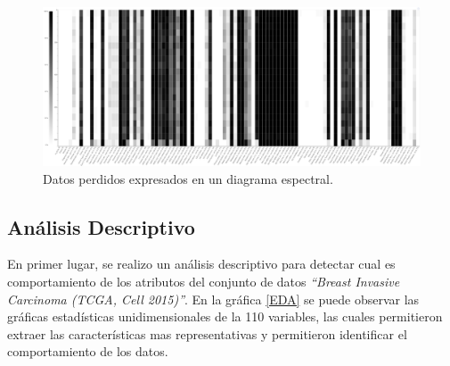 \begin{figure}[!htb]
	\centering
	\includegraphics[width=1
	\linewidth]{IMAGENES/Missing_Spectrum}
	\caption{Datos perdidos expresados en un diagrama espectral.}
	\label{Missing_Spectrum}
\end{figure}


\subsection{Análisis Descriptivo }
En primer lugar, se realizo un análisis descriptivo para detectar cual es comportamiento de los atributos del conjunto de datos \textit{“Breast Invasive Carcinoma (TCGA, Cell 2015)”}. En la gráfica \ref{EDA} se puede observar las gráficas estadísticas unidimensionales de la 110 variables, las cuales permitieron extraer  las características mas representativas y permitieron identificar el comportamiento de los datos.

